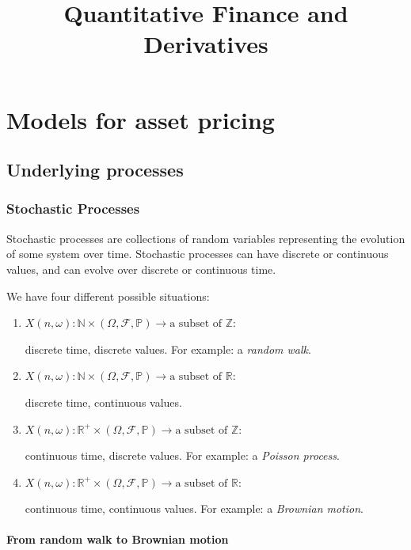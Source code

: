 \documentclass[twoside,openright,titlepage,headinclude,12pt,a4paper,BCOR5mm,footinclude]{book}
\title{Quantitative Finance and Derivatives}
\theoremstyle{definition}
\begin{document}
\maketitle
\tableofcontents

\chapter{Models for asset pricing}

\section{Underlying processes}

  \subsection{Stochastic Processes}

  Stochastic  processes are  collections  of random  variables representing  the
  evolution of some system over time.  Stochastic processes can have discrete or
  continuous values, and can evolve over discrete or continuous time.

  We have four different possible situations:
  \begin{enumerate}
    \item \(X(n,\omega) : \mathbb{N} \times (\Omega,\mathcal{F},\mathbb{P}) \to \text{a subset of } \mathbb{Z}\):

      discrete time, discrete values. For example: a \textit{random walk}.
    \item \(X(n,\omega) : \mathbb{N} \times (\Omega,\mathcal{F},\mathbb{P}) \to \text{a subset of } \mathbb{R}\):

      discrete time, continuous values.
    \item \(X(n,\omega) : \mathbb{R}^+ \times (\Omega,\mathcal{F},\mathbb{P}) \to \text{a subset of } \mathbb{Z}\):

      continuous time, discrete values. For example: a \textit{Poisson process}.
    \item \(X(n,\omega) : \mathbb{R}^+ \times (\Omega,\mathcal{F},\mathbb{P}) \to \text{a subset of } \mathbb{R}\):

      continuous time, continuous values. For example: a \textit{Brownian motion}.
  \end{enumerate}

  \subsubsection{From random walk to Brownian motion}
\end{document}

